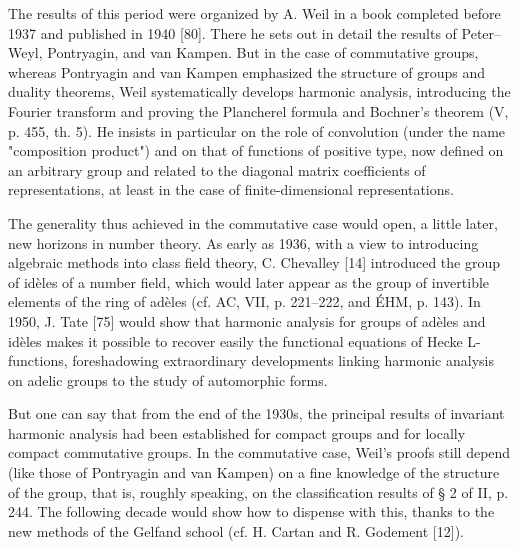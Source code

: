 The results of this period were organized by A. Weil in a book completed before 1937 and published in 1940 {[}80{]}. There he sets out in detail the results of Peter--Weyl, Pontryagin, and van Kampen. But in the case of commutative groups, whereas Pontryagin and van Kampen emphasized the structure of groups and duality theorems, Weil systematically develops harmonic analysis, introducing the Fourier transform and proving the Plancherel formula and Bochner's theorem (V, p. 455, th. 5). He insists in particular on the role of convolution (under the name "composition product") and on that of functions of positive type, now defined on an arbitrary group and related to the diagonal matrix coefficients of representations, at least in the case of finite-dimensional representations.

The generality thus achieved in the commutative case would open, a little later, new horizons in number theory. As early as 1936, with a view to introducing algebraic methods into class field theory, C. Chevalley {[}14{]} introduced the group of idèles of a number field, which would later appear as the group of invertible elements of the ring of adèles (cf. AC, VII, p. 221--222, and ÉHM, p. 143). In 1950, J. Tate {[}75{]} would show that harmonic analysis for groups of adèles and idèles makes it possible to recover easily the functional equations of Hecke L-functions, foreshadowing extraordinary developments linking harmonic analysis on adelic groups to the study of automorphic forms.

But one can say that from the end of the 1930s, the principal results of invariant harmonic analysis had been established for compact groups and for locally compact commutative groups. In the commutative case, Weil's proofs still depend (like those of Pontryagin and van Kampen) on a fine knowledge of the structure of the group, that is, roughly speaking, on the classification results of § 2 of II, p. 244. The following decade would show how to dispense with this, thanks to the new methods of the Gelfand school (cf. H. Cartan and R. Godement {[}12{]}).


